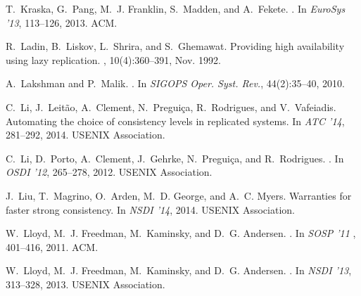 \documentclass[11pt]{article}
\begin{document}
\begin{thebibliography}{10}
\begin{small}
T.~Kraska, G.~Pang, M.~J. Franklin, S.~Madden, and A.~Fekete.
.
\newblock In {\em EuroSys '13}, 113--126, 2013. ACM.

R.~Ladin, B.~Liskov, L.~Shrira, and S.~Ghemawat.
\newblock Providing high availability using lazy replication.
, 10(4):360--391, Nov. 1992.

A.~Lakshman and P.~Malik.
.
\newblock In {\em SIGOPS Oper. Syst. Rev.}, 44(2):35--40, 2010.

C.~Li, J.~Leit{\~a}o, A.~Clement, N.~Pregui{\c c}a, R.~Rodrigues, and
  V.~Vafeiadis.
\newblock Automating the choice of consistency levels in replicated systems.
\newblock In {\em ATC '14},
  281--292, 2014. USENIX Association.

C.~Li, D.~Porto, A.~Clement, J.~Gehrke, N.~Pregui\c{c}a, and R.~Rodrigues.
.
\newblock In {\em OSDI '12}, 265--278, 2012. USENIX
  Association.
  

J.~Liu, T.~Magrino, O.~Arden, M.~D. George, and A.~C. Myers.
\newblock Warranties for faster strong consistency.
\newblock In { \em NSDI '14}, 2014. USENIX Association.

W.~Lloyd, M.~J. Freedman, M.~Kaminsky, and D.~G. Andersen.
.
\newblock In { \em SOSP  '11}
, 401--416, 2011. ACM.

W.~Lloyd, M.~J. Freedman, M.~Kaminsky, and D.~G. Andersen.
.
\newblock In {\em  NSDI '13}, 313--328, 2013. USENIX
  Association.


\end{small}
\end{thebibliography}
\end{document}
